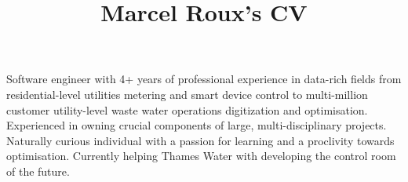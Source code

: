 \documentclass[a4paper,online,extended]{adcv}
\title{Marcel Roux's CV}
\newcommand*{\unistb}{Stellenbosch University}
\begin{document}

Software engineer with 4+ years of professional experience in data-rich fields from residential-level utilities metering and smart device control to multi-million customer utility-level waste water operations digitization and optimisation. Experienced in owning crucial components of large, multi-disciplinary projects. Naturally curious individual with a passion for learning and a proclivity towards optimisation. Currently helping Thames Water with developing the control room of the future.








\end{document}
